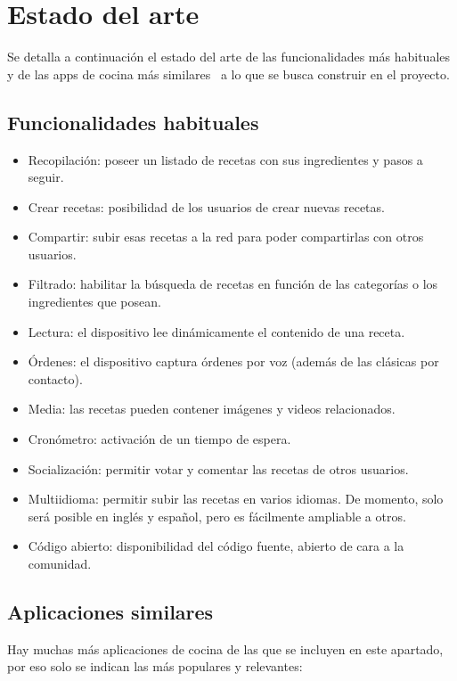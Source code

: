 \section{Estado del arte}
\label{sec:estado-del-arte}

Se detalla a continuación el estado del arte de las funcionalidades más
habituales y de las apps de cocina más similares~\cite{mejores-apps-cocina}
a lo que se busca construir en el proyecto.

\subsection{Funcionalidades habituales}

\begin{itemize}
\item Recopilación: poseer un listado de recetas con sus ingredientes
  y pasos a seguir.
\item Crear recetas: posibilidad de los usuarios de crear nuevas recetas.
\item Compartir: subir esas recetas a la red para poder compartirlas con
  otros usuarios.
\item Filtrado: habilitar la búsqueda de recetas en función de
  las categorías o los ingredientes que posean.
\item Lectura: el dispositivo lee dinámicamente el contenido de una
  receta.
\item Órdenes: el dispositivo captura órdenes por voz (además de
  las clásicas por contacto).
\item Media: las recetas pueden contener imágenes y videos
  relacionados.
\item Cronómetro: activación de un tiempo de espera.
\item Socialización: permitir votar y comentar las recetas de otros usuarios.
\item Multiidioma: permitir subir las recetas en varios idiomas. De momento,
  solo será posible en inglés y español, pero es fácilmente ampliable a otros.
\item Código abierto: disponibilidad del código fuente, abierto de cara a la
  comunidad.
\end{itemize}

\subsection{Aplicaciones similares}

Hay muchas más aplicaciones de cocina de las que se incluyen en este apartado,
por eso solo se indican las más populares y relevantes:

